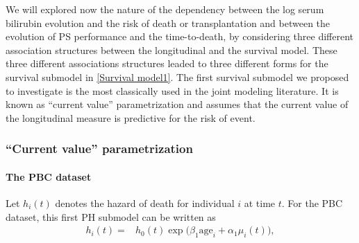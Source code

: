 \documentclass[12pt]{article}
\begin{document}
We will explored now the nature of the dependency between the log serum bilirubin evolution and the risk of death or transplantation and between the evolution of PS performance and the time-to-death, by considering three different association structures between the longitudinal and the survival model. These three different associations structures leaded to three different forms for the survival submodel in \eqref{Survival model1}.
The first survival submodel we proposed to investigate is the most classically used in the joint modeling literature. It is known as ``current value'' parametrization and assumes that the current value of the longitudinal measure is predictive for the risk of event. 

\subsubsection{``Current value'' parametrization}
\label{CV}

\paragraph{The PBC dataset}

Let $h_i(t)$ denotes the hazard of death for individual $i$ at time $t$. For the PBC dataset, this first PH submodel can be written as 
\begin{equation}
\begin{split}
h_i(t) = &h_0 (t) \exp \big(\beta_1 \text{age}_i+ \alpha_1 \mu_i(t)\big),
\end{split}
\label{Survival model_p1}
\end{equation}
\end{document}
